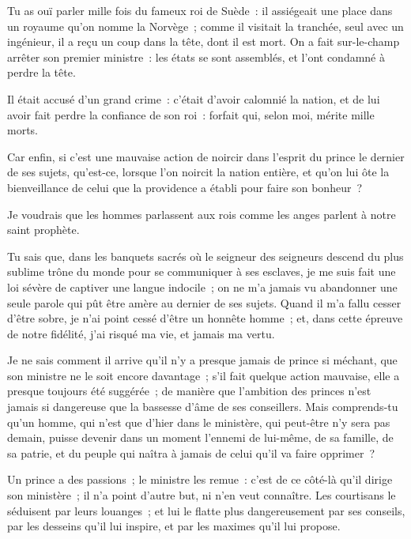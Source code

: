 \documentclass[french,twoside]{book} %
\newcommand{\dateline}[1]{\medskip{\RaggedLeft{#1}\par}\bigskip}
\begin{document}
\noindent Tu as ouï parler mille fois du fameux roi de Suède : il assiégeait une place dans un royaume qu’on nomme la Norvège ; comme il visitait la tranchée, seul avec un ingénieur, il a reçu un coup dans la tête, dont il est mort. On a fait sur-le-champ arrêter son premier ministre : les états se sont assemblés, et l’ont condamné à perdre la tête.\par
Il était accusé d’un grand crime : c’était d’avoir calomnié la nation, et de lui avoir fait perdre la confiance de son roi : forfait qui, selon moi, mérite mille morts.\par
Car enfin, si c’est une mauvaise action de noircir dans l’esprit du prince le dernier de ses sujets, qu’est-ce, lorsque l’on noircit la nation entière, et qu’on lui ôte la bienveillance de celui que la providence a établi pour faire son bonheur ?\par
Je voudrais que les hommes parlassent aux rois comme les anges parlent à notre saint prophète.\par
Tu sais que, dans les banquets sacrés où le seigneur des seigneurs descend du plus sublime trône du monde pour se communiquer à ses esclaves, je me suis fait une loi sévère de captiver une langue indocile ; on ne m’a jamais vu abandonner une seule parole qui pût être amère au dernier de ses sujets. Quand il m’a fallu cesser d’être sobre, je n’ai point cessé d’être un honnête homme ; et, dans cette épreuve de notre fidélité, j’ai risqué ma vie, et jamais ma vertu.\par
Je ne sais comment il arrive qu’il n’y a presque jamais de prince si méchant, que son ministre ne le soit encore davantage ; s’il fait quelque action mauvaise, elle a presque toujours été suggérée ; de manière que l’ambition des princes n’est jamais si dangereuse que la bassesse d’âme de ses conseillers. Mais comprends-tu qu’un homme, qui n’est que d’hier dans le ministère, qui peut-être n’y sera pas demain, puisse devenir dans un moment l’ennemi de lui-même, de sa famille, de sa patrie, et du peuple qui naîtra à jamais de celui qu’il va faire opprimer ?\par
Un prince a des passions ; le ministre les remue : c’est de ce côté-là qu’il dirige son ministère ; il n’a point d’autre but, ni n’en veut connaître. Les courtisans le séduisent par leurs louanges ; et lui le flatte plus dangereusement par ses conseils, par les desseins qu’il lui inspire, et par les maximes qu’il lui propose.\par

\dateline{De Paris, le 25 de la lune de Saphar, 1719.}
\end{document}

